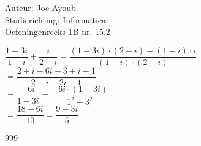 \documentclass[a4paper]{article}
\begin{document}
  
\noindent \large Auteur: Joe Ayoub \\
\noindent \large Studierichting:  Informatica\\
\noindent \large Oefeningenreeks 1B nr. 15.2\\

\medskip

\normalsize

$\dfrac{1 - 3i}{1 - i} + \dfrac{i}{2 - i} = \dfrac{(1 - 3i)\cdot(2 - i) + (1 - i)\cdot i}{(1 - i)\cdot(2 - i)}$ \\

$= \dfrac{2 + i - 6i - 3 + i + 1}{2 - i - 2i - 1}$ \\

$= \dfrac{-6i}{1 - 3i} = \dfrac{-6i \cdot (1 + 3i)}{1^2 + 3^2}$ \\

$= \dfrac{18 - 6i}{10} = \dfrac{9 - 3i}{5}$ \\



\begin{thebibliography}{999}
\end{thebibliography}
\end{document}
